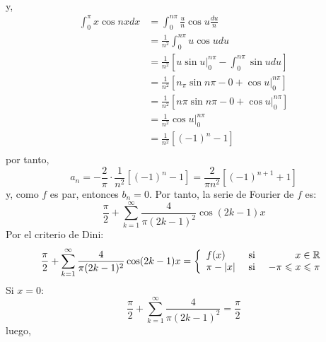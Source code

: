 \documentclass[12pt]{report}
\theoremstyle{largebreak}
\renewcommand{\leq}{\ensuremath{\leqslant}}
\newcommand\abs[1]{\ensuremath{\left|#1\right|}}
\begin{document}
\begin{exa}
\begin{equation*}
\begin{split}
            \end{split}
        \end{equation*}
        y,
        \begin{equation*}
            \begin{split}
                \int_{0}^\pi x\cos nxdx&=\int_{0}^{n\pi}\frac{u}{n}\cos u\frac{du}{n}\\
                &=\frac{1}{n^2}\int_{0}^{n\pi}u\cos udu\\
                &=\frac{1}{n^2}[u\sin u\Big|_0^{n\pi}-\int_0^{n\pi}\sin udu]\\
                &=\frac{1}{n^2}[n_\pi\sin n\pi-0+\cos u\Big|_0^{n\pi}]\\
                &=\frac{1}{n^2}[n\pi\sin n\pi-0+\cos u\Big|_0^{n\pi}]\\
                &=\frac{1}{n^2}\cos u\Big|_0^{n\pi}\\
                &=\frac{1}{n^2}[(-1)^{n}-1] \\
            \end{split}
        \end{equation*}
        por tanto,
        \begin{equation*}
            a_n=-\frac{2}{\pi}\cdot\frac{1}{n^2}[(-1)^{ n}-1]=\frac{2}{\pi n^2}[(-1)^{ n+1}+1]
        \end{equation*}
        y, como $f$ es par, entonces $b_n=0$. Por tanto, la serie de Fourier de $f$ es:
        \begin{equation*}
            \frac{\pi}{2}+\sum_{ k=1}^\infty\frac{4}{\pi(2k-1)^2}\cos(2k-1)x
        \end{equation*}
        Por el criterio de Dini:
        \begin{equation*}
            \frac{\pi}{2}+\sum_{ k=1}^\infty\frac{4}{\pi(2k-1)^2}\cos(2k-1)x=\left\{
                \begin{array}{lcr}
                    f(x) & \textup{ si } & x\in\mathbb{R}\\
                    \pi-\abs{x} & \textup{ si } & -\pi\leq x\leq\pi\\
                \end{array}
            \right.
        \end{equation*}
        Si $x=0$:
        \begin{equation*}
            \frac{\pi}{2}+\sum_{ k=1}^\infty\frac{4}{\pi(2k-1)^2}=\frac{\pi}{2}
        \end{equation*}
        luego,
        \begin{equation*}

\end{equation*}
\end{exa}
\end{document}
